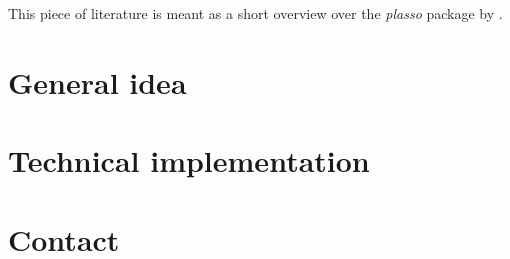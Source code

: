 \documentclass[12pt]{article}
\begin{document}
\maketitle

This piece of literature is meant as a short overview over the \emph{plasso} package by \citet{plasso}.

\section{General idea}

\section{Technical implementation}

\section{Contact}


\end{document}
